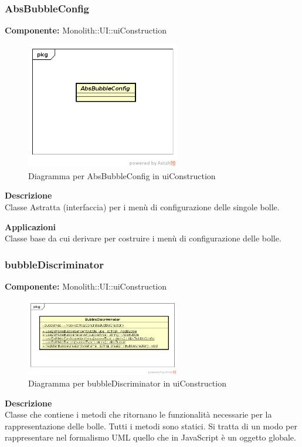 \clearpage

\subsubsection{AbsBubbleConfig}
\textbf{Componente:}  Monolith::UI::uiConstruction\\
   \FloatBarrier
   \begin{figure}[ht]
   \centering
   \includegraphics[width=0.6\textwidth]{img/single-AbsBubbleConfig.png}
   \caption{{Diagramma per AbsBubbleConfig in uiConstruction}}
\end{figure}
\FloatBarrier
\textbf{Descrizione}\\
Classe Astratta (interfaccia) per i menù di configurazione delle singole bolle. 


\textbf{Applicazioni}\\
Classe base da cui derivare per costruire i menù di configurazione delle bolle. 


\clearpage

\subsubsection{bubbleDiscriminator}
\textbf{Componente:}  Monolith::UI::uiConstruction\\
   \FloatBarrier
   \begin{figure}[ht]
   \centering
   \includegraphics[width=0.6\textwidth]{img/single-bubbleDiscriminator.png}
   \caption{{Diagramma per bubbleDiscriminator in uiConstruction}}
\end{figure}
\FloatBarrier
\textbf{Descrizione}\\
Classe che contiene i metodi che ritornano le funzionalità necessarie per la rappresentazione delle bolle. Tutti i metodi sono statici. Si tratta di un modo per rappresentare nel formalismo UML quello che in JavaScript è un oggetto globale.

